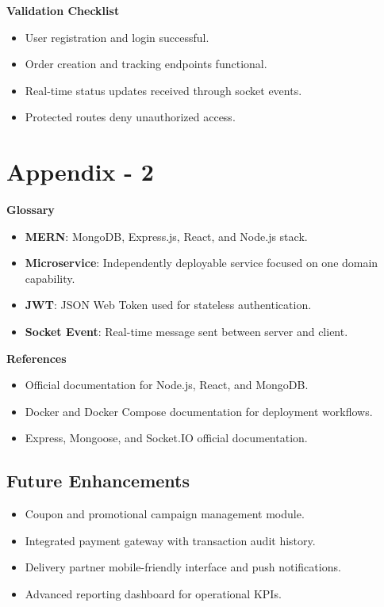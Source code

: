 \documentclass[12pt,a4paper]{report}
\begin{document}
\textbf{Validation Checklist}
\begin{itemize}
    \item User registration and login successful.
    \item Order creation and tracking endpoints functional.
    \item Real-time status updates received through socket events.
    \item Protected routes deny unauthorized access.
\end{itemize}

\chapter{Appendix - 2}
\textbf{Glossary}

\begin{itemize}
    \item \textbf{MERN}: MongoDB, Express.js, React, and Node.js stack.
    \item \textbf{Microservice}: Independently deployable service focused on one domain capability.
    \item \textbf{JWT}: JSON Web Token used for stateless authentication.
    \item \textbf{Socket Event}: Real-time message sent between server and client.
\end{itemize}

\textbf{References}

\begin{itemize}
    \item Official documentation for Node.js, React, and MongoDB.
    \item Docker and Docker Compose documentation for deployment workflows.
    \item Express, Mongoose, and Socket.IO official documentation.
\end{itemize}

\section{Future Enhancements}
\begin{itemize}
    \item Coupon and promotional campaign management module.
    \item Integrated payment gateway with transaction audit history.
    \item Delivery partner mobile-friendly interface and push notifications.
    \item Advanced reporting dashboard for operational KPIs.
\end{itemize}
\end{document}
